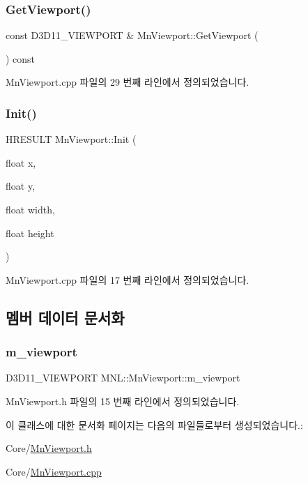 \subsubsection{\texorpdfstring{Get\+Viewport()}{GetViewport()}}
{\footnotesize\ttfamily const D3\+D11\+\_\+\+V\+I\+E\+W\+P\+O\+RT \& Mn\+Viewport\+::\+Get\+Viewport (\begin{DoxyParamCaption}{ }\end{DoxyParamCaption}) const}



Mn\+Viewport.\+cpp 파일의 29 번째 라인에서 정의되었습니다.

\mbox{\label{class_m_n_l_1_1_mn_viewport_ae96cefe1ab1b8ffa43b9c706ded1af7f}} 
\subsubsection{\texorpdfstring{Init()}{Init()}}
{\footnotesize\ttfamily H\+R\+E\+S\+U\+LT Mn\+Viewport\+::\+Init (\begin{DoxyParamCaption}\item[{float}]{x,  }\item[{float}]{y,  }\item[{float}]{width,  }\item[{float}]{height }\end{DoxyParamCaption})}



Mn\+Viewport.\+cpp 파일의 17 번째 라인에서 정의되었습니다.



\subsection{멤버 데이터 문서화}
\mbox{\label{class_m_n_l_1_1_mn_viewport_a7d14dcbfd2762a2a65c8c408bf4e9c1f}} 
\subsubsection{\texorpdfstring{m\+\_\+viewport}{m\_viewport}}
{\footnotesize\ttfamily D3\+D11\+\_\+\+V\+I\+E\+W\+P\+O\+RT M\+N\+L\+::\+Mn\+Viewport\+::m\+\_\+viewport\hspace{0.3cm}{\ttfamily [private]}}



Mn\+Viewport.\+h 파일의 15 번째 라인에서 정의되었습니다.



이 클래스에 대한 문서화 페이지는 다음의 파일들로부터 생성되었습니다.\+:\begin{DoxyCompactItemize}
\item 
Core/\hyperlink{_mn_viewport_8h}{Mn\+Viewport.\+h}\item 
Core/\hyperlink{_mn_viewport_8cpp}{Mn\+Viewport.\+cpp}\end{DoxyCompactItemize}
